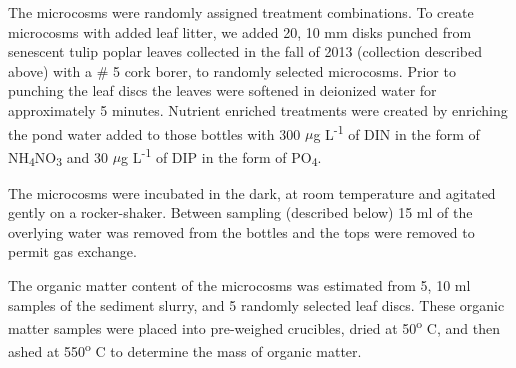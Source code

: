 The microcosms were randomly assigned treatment combinations. To create microcosms with added leaf litter, we added 20, 10 mm disks punched from senescent tulip poplar leaves collected in the fall of 2013 (collection described above) with a \# 5 cork borer, to randomly selected microcosms. Prior to punching the leaf discs the leaves were softened in deionized water for approximately 5 minutes. Nutrient enriched treatments were created by enriching the pond water added to those bottles with 300 $\mu$g L\textsuperscript{-1} of DIN in the form of NH\textsubscript{4}NO\textsubscript{3} and 30 $\mu$g L\textsuperscript{-1} of DIP in the form of PO\textsubscript{4}.

The microcosms were incubated in the dark, at room temperature and agitated gently on a rocker-shaker. Between sampling (described below) 15 ml of the overlying water was removed from the bottles and the tops were removed to permit gas exchange.

The organic matter content of the microcosms was estimated from 5, 10 ml samples of the sediment slurry, and 5 randomly selected leaf discs. These organic matter samples were placed into pre-weighed crucibles, dried at 50\textsuperscript{o} C, and then ashed at 550\textsuperscript{o} C to determine the mass of organic matter.



    
    
